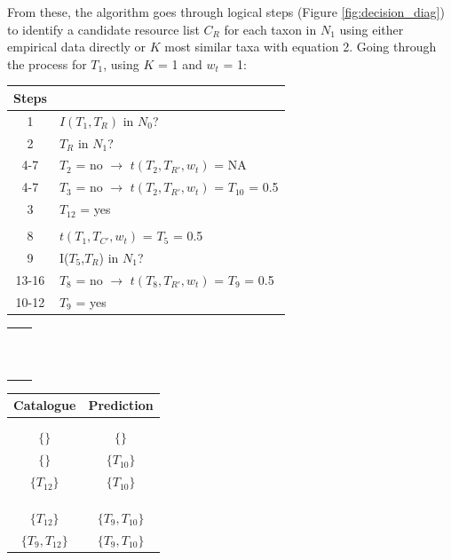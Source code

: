 From these, the algorithm goes through logical steps (Figure \ref{fig:decision_diag}) to identify a candidate resource list $C_R$ for each taxon in $N_1$ using either empirical data directly or $K$ most similar taxa with equation 2. Going through the process for $T_1$, using $K$ = 1 and $w_t$ = 1:
\bigskip

\begin{singlespace}
\begin{table}[h!]
  \centering
  \small
  \begin{tabular}{cl}
      Steps \\
      \hline
      1        &$I(T_1,T_R)$ in $N_0$? \\
      2        &$T_R$ in $N_1$? \\
      4-7      &$T_2$ = no $\rightarrow$ $t(T_2, T_{R'}, w_t)$ = NA   \\
      4-7      &$T_3$ = no $\rightarrow$ $t(T_2, T_{R'}, w_t)$ = $T_{10}$ = 0.5 \\
      3        &$T_{12}$ = yes    \\  \\
      8        &$t(T_1, T_{C'}, w_t)$ = $T_5$ = 0.5            \\
      9        &I($T_5$,$T_R$) in $N_1$? \\
      13-16    &$T_8$ = no $\rightarrow$ $t(T_8, T_{R'}, w_t)$ = $T_9$ = 0.5  \\
      10-12    &$T_9$ = yes   \\
  \end{tabular}
  \begin{tabular}{c|c}
     & \\  \\  \\  \\  \\  \\  \\  \\  \\  \\  \\
  \end{tabular}
  \begin{tabular}{cc}
      Catalogue   & Prediction \\
      \hline \\ \\
      $\{\}$    & $\{\}$            \\
      $\{\}$    & $\{T_{10}\}$      \\
      $\{T_{12}\}$    & $\{T_{10}\}$      \\  \\  \\ \\
      $\{T_{12}\}$    & $\{T_9, T_{10}\}$      \\
      $\{T_9, T_{12}\}$    & $\{T_9, T_{10}\}$      \\
  \end{tabular}
\end{table}
\end{singlespace}
\bigskip

